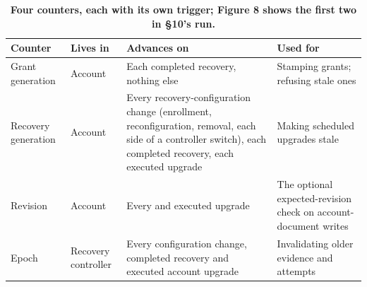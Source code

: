 \begin{table}[tbp]
\centering
\caption{\textbf{Four counters, each with its own trigger; Figure 8 shows the first two in \S{}10's run.} }\label{tab:tab-5}
\footnotesize\begin{tabularx}{\linewidth}{@{}LLLL@{}}
\toprule
\textbf{Counter} & \textbf{Lives in} & \textbf{Advances on} & \textbf{Used for} \\
\midrule
Grant generation & Account & Each completed recovery, nothing else & Stamping grants; refusing stale ones \\
Recovery generation & Account & Every recovery-configuration change (enrollment, reconfiguration, removal, each side of a controller switch), each completed recovery, each executed upgrade & Making scheduled upgrades stale \\
Revision & Account & Every  and executed upgrade & The optional expected-revision check on account-document writes \\
Epoch & Recovery controller & Every configuration change, completed recovery and executed account upgrade & Invalidating older evidence and attempts \\
\bottomrule
\end{tabularx}
\end{table}
